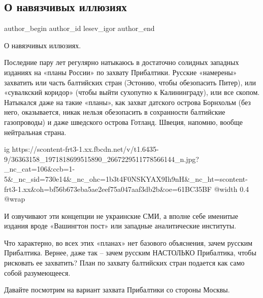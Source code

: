  
 
 
 
 
 
\subsection{О навязчивых иллюзиях}
\label{sec:28_06_2018.fb.lesev_igor.1.illjuzii_moskva_pribaltika}
 
\ifcmt
 author_begin
   author_id lesev_igor
 author_end
\fi

О навязчивых иллюзиях.

Последние пару лет регулярно натыкаюсь в достаточно солидных западных изданиях
на «планы России» по захвату Прибалтики. Русские «намерены» захватить или часть
балтийских стран (Эстонию, чтобы обезопасить Питер), или «сувалкский коридор»
(чтобы выйти сухопутно к Калининграду), или все скопом. Натыкался даже на такие
«планы», как захват датского острова Борнхольм (без него, оказывается, никак
нельзя обезопасить в сохранности балтийские газопроводы) и даже шведского
острова Готланд. Швеция, напомню, вообще нейтральная страна.

\ifcmt
  ig https://scontent-frt3-1.xx.fbcdn.net/v/t1.6435-9/36363158_1971818699515890_2667229511778566144_n.jpg?_nc_cat=106&ccb=1-5&_nc_sid=730e14&_nc_ohc=1b3t4F0NSKYAX9Ih9nH&_nc_ht=scontent-frt3-1.xx&oh=bf56b673eba5ae2eef75a047aaf3db2b&oe=61BC35BF
  @width 0.4
  @wrap 
\fi

И озвучивают эти концепции не украинские СМИ, а вполне себе именитые издания
вроде «Вашингтон пост» или западные аналитические институты.

Что характерно, во всех этих «планах» нет базового объяснения, зачем русским
Прибалтика. Вернее, даже так – зачем русским НАСТОЛЬКО Прибалтика, чтобы
рисковать ее захватить? План по захвату балтийских стран подается как само
собой разумеющееся.

Давайте посмотрим на вариант захвата Прибалтики со стороны Москвы.

